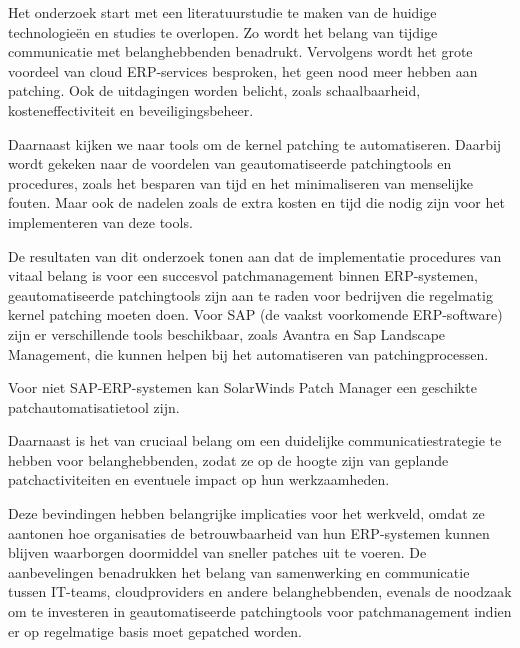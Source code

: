 Het onderzoek start met een literatuurstudie te maken van de huidige technologieën en studies te overlopen. Zo wordt het belang van tijdige communicatie met belanghebbenden benadrukt. Vervolgens wordt het grote voordeel van cloud ERP-services besproken, het geen nood meer hebben aan patching. Ook de uitdagingen worden belicht, zoals schaalbaarheid, kosteneffectiviteit en beveiligingsbeheer.

Daarnaast kijken we naar tools om de kernel patching te automatiseren. Daarbij wordt gekeken naar de voordelen van geautomatiseerde patchingtools en procedures, zoals het besparen van tijd en het minimaliseren van menselijke fouten. Maar ook de nadelen zoals de extra kosten en tijd die nodig zijn voor het implementeren van deze tools.

De resultaten van dit onderzoek tonen aan dat de implementatie procedures van vitaal belang is voor een succesvol patchmanagement binnen ERP-systemen, geautomatiseerde patchingtools zijn aan te raden voor bedrijven die regelmatig kernel patching moeten doen. Voor SAP (de vaakst voorkomende ERP-software) zijn er verschillende tools beschikbaar, zoals Avantra en Sap Landscape Management, die kunnen helpen bij het automatiseren van patchingprocessen. 

Voor niet SAP-ERP-systemen kan SolarWinds Patch Manager een geschikte patchautomatisatietool zijn.

Daarnaast is het van cruciaal belang om een duidelijke communicatiestrategie te hebben voor belanghebbenden, zodat ze op de hoogte zijn van geplande patchactiviteiten en eventuele impact op hun werkzaamheden.

Deze bevindingen hebben belangrijke implicaties voor het werkveld, omdat ze aantonen hoe organisaties de betrouwbaarheid van hun ERP-systemen kunnen blijven waarborgen doormiddel van sneller patches uit te voeren. De aanbevelingen benadrukken het belang van samenwerking en communicatie tussen IT-teams, cloudproviders en andere belanghebbenden, evenals de noodzaak om te investeren in geautomatiseerde patchingtools voor patchmanagement indien er op regelmatige basis moet gepatched worden.